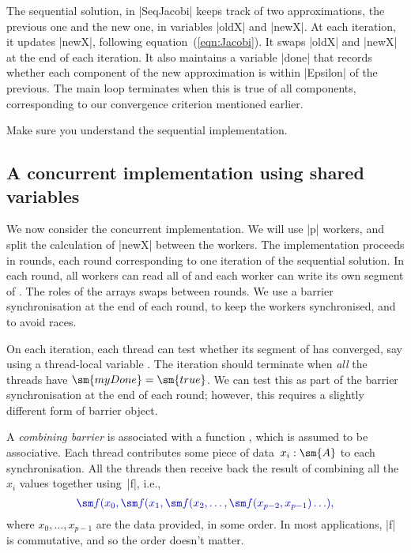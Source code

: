 The sequential solution, in |SeqJacobi| keeps track of two approximations, the
previous one and the new one, in variables |oldX| and |newX|.  At each
iteration, it updates |newX|, following equation~(\ref{eqn:Jacobi}).  It swaps
|oldX| and |newX| at the end of each iteration.  It also maintains a variable
|done| that records whether each component of the new approximation is within
|Epsilon| of the previous.  The main loop terminates when this is true of all
components, corresponding to our convergence criterion mentioned earlier. 

\begin{instruction}
Make sure you understand the sequential implementation.
\end{instruction}


\subsection{A concurrent implementation using shared variables}

We now consider the concurrent implementation.  We will use |p| workers, and
split the calculation of |newX| between the workers.  The implementation
proceeds in rounds, each round corresponding to one iteration of the
sequential solution.  In each round, all workers can read all of 
and each worker can write its own segment of .  The roles of the
arrays swaps between rounds.  We use a barrier synchronisation at the end of
each round, to keep the workers synchronised, and to avoid races. 

On each iteration, each thread can test whether its segment of  has
converged, say using a thread-local variable .  The iteration
should terminate when \emph{all} the threads have $\sm{myDone} = \sm{true}$.
We can test this as part of the barrier synchronisation at the end of each
round; however, this requires a slightly different form of barrier object.  

A \emph{combining barrier} is associated with a function , which is assumed to be associative.  Each thread contributes some piece
of data~$x_i: \sm{A}$ to each synchronisation.  All the threads then receive
back the result of combining all the $x_i$ values together using~|f|, i.e.,
\[\mstyle
\sm f(x_0, \sm f(x_1, \sm f(x_2, \ldots, \sm f(x_{p-2}, x_{p-1})\ldots),
\]
where $x_0, \ldots, x_{p-1}$ are the data provided, in some order.  In most
applications, |f| is commutative, and so the order doesn't matter.

